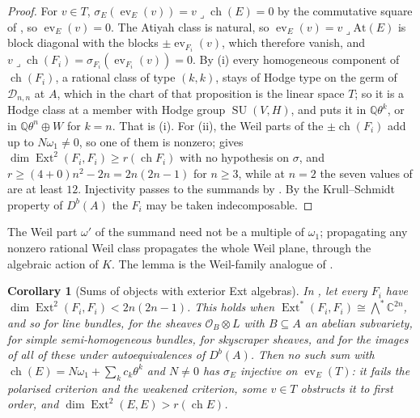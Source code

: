 \documentclass[11pt,reqno]{amsart}
\theoremstyle{plain}
\newtheorem{corollary}[theorem]{Corollary}
\theoremstyle{definition}
\theoremstyle{remark}
\newcommand{\QQ}{\mathbb{Q}}
\newcommand{\CC}{\mathbb{C}}
\newcommand{\cO}{\mathcal{O}}
\newcommand{\cD}{\mathcal{D}}
\newcommand{\HW}{W}                      %
\DeclareMathOperator{\ch}{ch}
\DeclareMathOperator{\Ext}{Ext}
\DeclareMathOperator{\SU}{SU}
\begin{document}
\begin{proof}
For $v\in T$, $\sigma_{E}(\operatorname{ev}_{E}(v))=v\lrcorner\ch(E)=0$ by the
commutative square of , so $\operatorname{ev}_{E}(v)=0$.
The Atiyah class is natural, so $\operatorname{ev}_{E}(v)=v\lrcorner
\mathrm{At}(E)$ is block diagonal with the blocks $\pm\operatorname{ev}_{F_{i}}(v)$,
which therefore vanish, and $v\lrcorner\ch(F_{i})=\sigma_{F_{i}}
(\operatorname{ev}_{F_{i}}(v))=0$. By (i) every
homogeneous component of $\ch(F_{i})$, a rational class of type $(k,k)$, stays
of Hodge type on the germ of $\cD_{n,n}$ at $A$, which in the chart of that
proposition is the linear space $T$; so it is a Hodge class at a member with
Hodge group $\SU(V,H)$, and \cite[Theorem~4.14]{paperI} puts it in $\QQ\theta^{k}$, or
in $\QQ\theta^{n}\oplus\HW$ for $k=n$. That is (i). For (ii), the Weil parts
of the $\pm\ch(F_{i})$ add up to $N\omega_{1}\ne0$, so one of them is nonzero;
 gives $\dim\Ext^{2}(F_{i},F_{i})\ge r(\ch F_{i})$ with
no hypothesis on $\sigma$, and $r\ge(4+0)n^{2}-2n=2n(2n-1)$ for $n\ge3$, while
at $n=2$ the seven values of  are at least $12$. Injectivity
passes to the summands by \cite[Lemma~3.38]{paperIII}. By the Krull--Schmidt property
of $D^{b}(A)$ the $F_{i}$ may be taken indecomposable.
\end{proof}

The Weil part $\omega'$ of the summand need not be a multiple of $\omega_{1}$;
propagating any nonzero rational Weil class propagates the whole Weil plane,
through the algebraic action of $K$. The lemma is the Weil-family analogue of
\cite[Corollary~3.41(ii)]{paperIII}.

\begin{corollary}[Sums of objects with exterior Ext algebras]
\label{cor:naturalsums}
In , let every $F_{i}$ have
$\dim\Ext^{2}(F_{i},F_{i})<2n(2n-1)$. This holds when
$\Ext^{*}(F_{i},F_{i})\cong\bigwedge^{*}\CC^{2n}$, and so for line bundles, for
the sheaves $\cO_{B}\otimes L$ with $B\subseteq A$ an abelian subvariety, for
simple semi-homogeneous bundles, for skyscraper sheaves, and for the images of
all of these under autoequivalences of $D^{b}(A)$. Then no such sum with
$\ch(E)=N\omega_{1}+\sum_{k}c_{k}\theta^{k}$ and $N\ne0$ has $\sigma_{E}$
injective on $\operatorname{ev}_{E}(T)$: it fails the polarised criterion and
the weakened criterion, some $v\in T$ obstructs it to first order, and
$\dim\Ext^{2}(E,E)>r(\ch E)$.
\end{corollary}
\end{document}
